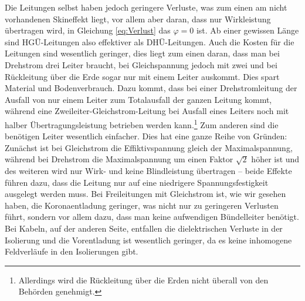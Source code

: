 Die Leitungen selbst haben jedoch geringere Verluste, was zum einen am nicht vorhandenen Skineffekt liegt, vor allem aber daran, dass nur Wirkleistung übertragen wird, in Gleichung \eqref{eq:Verlust} das $\varphi=0$ ist. Ab einer gewissen Länge sind HGÜ-Leitungen also effektiver als DHÜ-Leitungen.
Auch die Kosten für die Leitungen sind wesentlich geringer, dies liegt zum einen daran, dass man bei Drehstrom drei Leiter braucht, bei Gleichspannung jedoch mit zwei und bei Rückleitung über die Erde sogar nur mit einem Leiter auskommt. Dies spart Material und Bodenverbrauch. %
Dazu kommt, dass bei einer Drehstromleitung der Ausfall von nur einem Leiter zum Totalausfall der ganzen Leitung kommt, während eine Zweileiter-Gleichstrom-Leitung bei Ausfall eines Leiters noch mit halber Übertragungsleistung betrieben werden kann.\cite{Schymroch}\footnote{Allerdings wird die Rückleitung über die Erden nicht überall von den Behörden genehmigt.}%
Zum anderen sind die benötigen Leiter wesentlich einfacher. Dies hat eine ganze Reihe von Gründen:
Zunächst ist bei Gleichstrom die Effiktivspannung gleich der Maximalspannung, während bei Drehstrom die Maximalspannung um einen Faktor $\sqrt{2}$ höher ist und des weiteren wird nur Wirk- und keine Blindleistung übertragen -- beide Effekte führen dazu, dass die Leitung nur auf eine niedrigere Spannungsfestigkeit ausgelegt werden muss. %
Bei Freileitungen mit Gleichstrom ist, wie wir gesehen haben, die Koronaentladung geringer, was nicht nur zu geringeren Verlusten führt, sondern vor allem dazu, dass man keine aufwendigen Bündelleiter benötigt.
Bei Kabeln, auf der anderen Seite, entfallen die dielektrischen Verluste in der Isolierung und die Vorentladung ist wesentlich geringer, da es keine inhomogene Feldverläufe in den Isolierungen gibt. %

